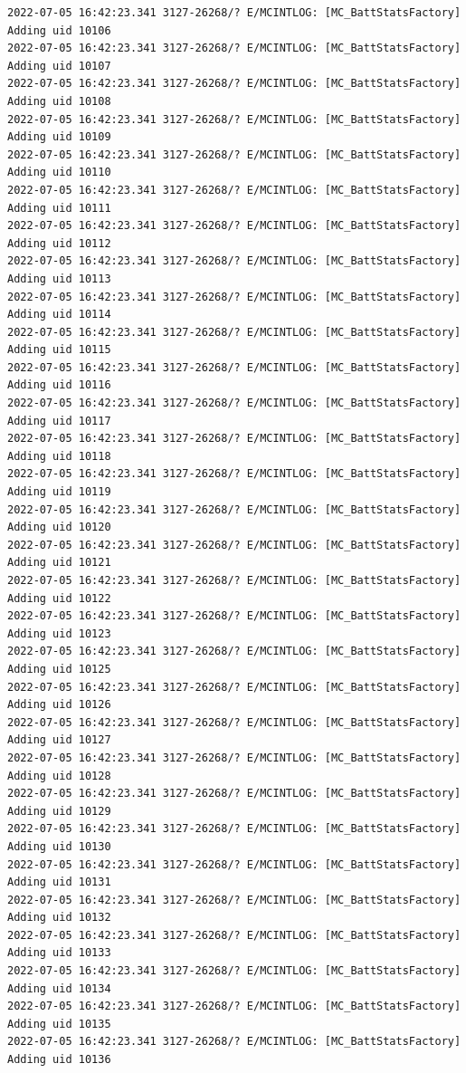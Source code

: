 \documentclass[a4paper,12pt]{book}
\begin{document}
\begin{lstlisting}
2022-07-05 16:42:23.341 3127-26268/? E/MCINTLOG: [MC_BattStatsFactory] Adding uid 10106
2022-07-05 16:42:23.341 3127-26268/? E/MCINTLOG: [MC_BattStatsFactory] Adding uid 10107
2022-07-05 16:42:23.341 3127-26268/? E/MCINTLOG: [MC_BattStatsFactory] Adding uid 10108
2022-07-05 16:42:23.341 3127-26268/? E/MCINTLOG: [MC_BattStatsFactory] Adding uid 10109
2022-07-05 16:42:23.341 3127-26268/? E/MCINTLOG: [MC_BattStatsFactory] Adding uid 10110
2022-07-05 16:42:23.341 3127-26268/? E/MCINTLOG: [MC_BattStatsFactory] Adding uid 10111
2022-07-05 16:42:23.341 3127-26268/? E/MCINTLOG: [MC_BattStatsFactory] Adding uid 10112
2022-07-05 16:42:23.341 3127-26268/? E/MCINTLOG: [MC_BattStatsFactory] Adding uid 10113
2022-07-05 16:42:23.341 3127-26268/? E/MCINTLOG: [MC_BattStatsFactory] Adding uid 10114
2022-07-05 16:42:23.341 3127-26268/? E/MCINTLOG: [MC_BattStatsFactory] Adding uid 10115
2022-07-05 16:42:23.341 3127-26268/? E/MCINTLOG: [MC_BattStatsFactory] Adding uid 10116
2022-07-05 16:42:23.341 3127-26268/? E/MCINTLOG: [MC_BattStatsFactory] Adding uid 10117
2022-07-05 16:42:23.341 3127-26268/? E/MCINTLOG: [MC_BattStatsFactory] Adding uid 10118
2022-07-05 16:42:23.341 3127-26268/? E/MCINTLOG: [MC_BattStatsFactory] Adding uid 10119
2022-07-05 16:42:23.341 3127-26268/? E/MCINTLOG: [MC_BattStatsFactory] Adding uid 10120
2022-07-05 16:42:23.341 3127-26268/? E/MCINTLOG: [MC_BattStatsFactory] Adding uid 10121
2022-07-05 16:42:23.341 3127-26268/? E/MCINTLOG: [MC_BattStatsFactory] Adding uid 10122
2022-07-05 16:42:23.341 3127-26268/? E/MCINTLOG: [MC_BattStatsFactory] Adding uid 10123
2022-07-05 16:42:23.341 3127-26268/? E/MCINTLOG: [MC_BattStatsFactory] Adding uid 10125
2022-07-05 16:42:23.341 3127-26268/? E/MCINTLOG: [MC_BattStatsFactory] Adding uid 10126
2022-07-05 16:42:23.341 3127-26268/? E/MCINTLOG: [MC_BattStatsFactory] Adding uid 10127
2022-07-05 16:42:23.341 3127-26268/? E/MCINTLOG: [MC_BattStatsFactory] Adding uid 10128
2022-07-05 16:42:23.341 3127-26268/? E/MCINTLOG: [MC_BattStatsFactory] Adding uid 10129
2022-07-05 16:42:23.341 3127-26268/? E/MCINTLOG: [MC_BattStatsFactory] Adding uid 10130
2022-07-05 16:42:23.341 3127-26268/? E/MCINTLOG: [MC_BattStatsFactory] Adding uid 10131
2022-07-05 16:42:23.341 3127-26268/? E/MCINTLOG: [MC_BattStatsFactory] Adding uid 10132
2022-07-05 16:42:23.341 3127-26268/? E/MCINTLOG: [MC_BattStatsFactory] Adding uid 10133
2022-07-05 16:42:23.341 3127-26268/? E/MCINTLOG: [MC_BattStatsFactory] Adding uid 10134
2022-07-05 16:42:23.341 3127-26268/? E/MCINTLOG: [MC_BattStatsFactory] Adding uid 10135
2022-07-05 16:42:23.341 3127-26268/? E/MCINTLOG: [MC_BattStatsFactory] Adding uid 10136

\end{lstlisting}
\end{document}
